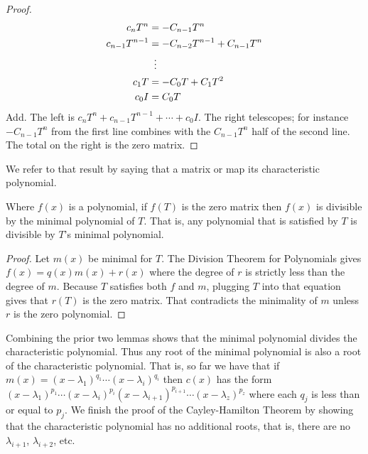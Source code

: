 \begin{proof}
\begin{align*}
  c_nT^n
  &=-C_{n-1}T^n    \\
  c_{n-1}T^{n-1}
  &=-C_{n-2}T^{n-1}+C_{n-1}T^n    \\
  &\vdotswithin{=}             \\
  c_{1}T
  &=-C_{0}T+C_{1}T^2    \\
  c_{0}I
  &=C_{0}T
\end{align*}
Add.
The left is 
\( c_nT^n+c_{n-1}T^{n-1}+\cdots+c_0I \). 
The right telescopes;
for instance $-C_{n-1}T^n$ from the first line combines with the 
$C_{n-1}T^n$ half of the second line. 
The total on the right is the zero matrix.
\end{proof}

We refer to that result by saying that a
matrix or map 
its characteristic polynomial.

\begin{lemma} \label{le:tSatisImpMinPolyDivides}
Where \( f(x) \) is a polynomial, if \( f(T) \) is the zero matrix 
then \( f(x) \) is divisible by the minimal polynomial of \( T \).
That is, any polynomial that is satisfied by \( T \) is divisible by
\( T \)'s minimal polynomial.
\end{lemma}

\begin{proof}
Let \( m(x) \) be minimal for \( T \).
The Division Theorem for Polynomials gives
\( f(x)=q(x)m(x)+r(x) \)
where the degree of \( r \) is strictly less than the degree of \( m \).
Because $T$ satisfies both $f$ and $m$, plugging $T$ into that equation gives
that \( r(T) \) is the zero matrix.
That contradicts the minimality of \( m \) unless \( r \)
is the zero polynomial.
\end{proof}

Combining the prior two lemmas shows that the minimal polynomial 
divides the characteristic polynomial. 
Thus
any root of the minimal polynomial is also a root of the characteristic
polynomial. 
That is, so far we have that if 
\( m(x)=(x-\lambda_1)^{q_1}\cdots(x-\lambda_i)^{q_i} \) then
\( c(x) \) has the form
\( (x-\lambda_1)^{p_1}\cdots(x-\lambda_i)^{p_i}
     (x-\lambda_{i+1})^{p_{i+1}}\cdots(x-\lambda_z)^{p_z} \) where
each \( q_j \) is less than or equal to \( p_j \).
We finish the proof of the Cayley-Hamilton Theorem by showing that 
the characteristic polynomial has no additional roots, that is,
there are no $\lambda_{i+1}$, $\lambda_{i+2}$, etc.

